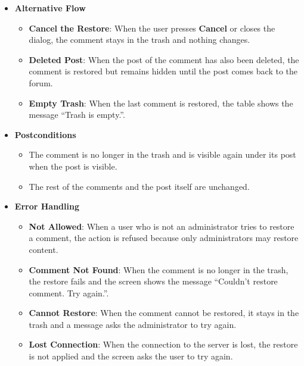\begin{itemize}[leftmargin=1.6em,topsep=4pt,itemsep=3pt,parsep=0pt,label=$\bullet$]
\begin{itemize}[leftmargin=2.2em,topsep=2pt,itemsep=3pt,parsep=0pt,label=$\circ$]
            \item \textbf{Update the Trash}: The restored comment disappears from the trash list and the remaining rows move up.
        \end{itemize}
    \item \textbf{Alternative Flow}
        \begin{itemize}[leftmargin=2.2em,topsep=2pt,itemsep=3pt,parsep=0pt,label=$\circ$]
            \item \textbf{Cancel the Restore}: When the user presses \textbf{Cancel} or closes the dialog, the comment stays in the trash and nothing changes.
            \item \textbf{Deleted Post}: When the post of the comment has also been deleted, the comment is restored but remains hidden until the post comes back to the forum.
            \item \textbf{Empty Trash}: When the last comment is restored, the table shows the message ``Trash is empty.''.
        \end{itemize}
    \item \textbf{Postconditions}
        \begin{itemize}[leftmargin=2.2em,topsep=2pt,itemsep=3pt,parsep=0pt,label=$\circ$]
            \item The comment is no longer in the trash and is visible again under its post when the post is visible.
            \item The rest of the comments and the post itself are unchanged.
        \end{itemize}
    \item \textbf{Error Handling}
        \begin{itemize}[leftmargin=2.2em,topsep=2pt,itemsep=3pt,parsep=0pt,label=$\circ$]
            \item \textbf{Not Allowed}: When a user who is not an administrator tries to restore a comment, the action is refused because only administrators may restore content.
            \item \textbf{Comment Not Found}: When the comment is no longer in the trash, the restore fails and the screen shows the message ``Couldn't restore comment. Try again.''.
            \item \textbf{Cannot Restore}: When the comment cannot be restored, it stays in the trash and a message asks the administrator to try again.
            \item \textbf{Lost Connection}: When the connection to the server is lost, the restore is not applied and the screen asks the user to try again.

\end{itemize}
\end{itemize}
